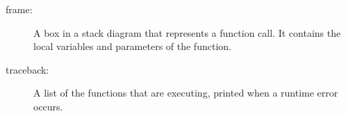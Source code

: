\begin{description}
\item[frame:]  A box in a stack diagram that represents a function call.
It contains the local variables and parameters of the function.

\item[traceback:]  A list of the functions that are executing,
printed when a runtime error occurs.


\end{description}
